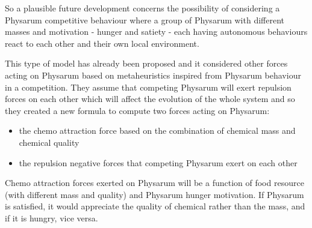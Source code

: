 \par
So a plausible future development concerns the possibility of considering a Physarum competitive behaviour where a group of Physarum with different masses and motivation - hunger and satiety - each having autonomous behaviours react to each other and their own local environment. 

\par
This type of model has already been proposed \cite{hex_phy} and it considered other forces acting on Physarum based on metaheuristics inspired from Physarum behaviour in a competition. They assume that competing Physarum will exert repulsion forces on each other which will affect the evolution of the whole system and so they created a new formula to compute two forces acting on Physarum: 

\begin{itemize}
	\item the chemo attraction force based on the combination of chemical mass and chemical quality
	\item the repulsion negative forces that competing Physarum exert on each other
\end{itemize}

Chemo attraction forces exerted on Physarum will be a function of food resource (with different mass and quality) and Physarum hunger motivation. If Physarum is satisfied, it would appreciate the quality of chemical rather than the mass, and if it is hungry, vice versa.


